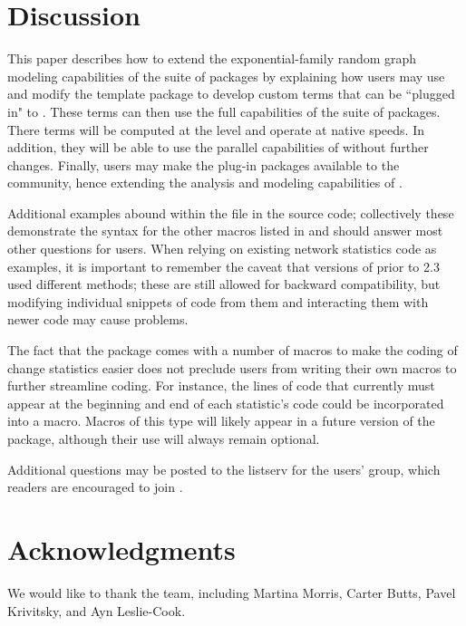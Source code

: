 \documentclass[nojss]{jss}
\begin{document}
\section{Discussion}

This paper describes how to extend the exponential-family random graph modeling
capabilities of the  suite of packages by
explaining how users may use and modify the template package  to develop custom terms that can be ``plugged in" to . These terms can then use the full capabilities of the  suite of packages.
There terms will be computed at the  level and operate at native speeds. In
addition, they will be able to use the parallel capabilities of 
without further changes. 
Finally, users may make the plug-in packages
available to the  community, hence extending the analysis and
modeling capabilities of .

Additional examples abound within the  file in the source
code; collectively these demonstrate the syntax for the other macros listed in
 and should answer most other questions for users. When
relying on existing network statistics code as examples, it is important to
remember the caveat that versions of  prior to 2.3 used different
methods; these are still allowed for backward compatibility, but modifying
individual snippets of code from them and interacting them with newer code may
cause problems.

The fact that the  package comes with a number of macros to
make the coding of change statistics easier does not preclude users from
writing their own macros to further streamline coding. For
instance, the lines of code that currently must appear at the beginning and end
of each statistic's  code could be incorporated into a macro. Macros
of this type will likely appear in a future version
of the  package, although their use will always remain
optional.

Additional questions may be posted to the listserv for the  users'
group, which readers are encouraged to join \citep{statnetusersgroup}.

\section*{Acknowledgments}

We would like to thank the  team, including Martina Morris, Carter
Butts, Pavel Krivitsky, and Ayn Leslie-Cook.







\end{document}
